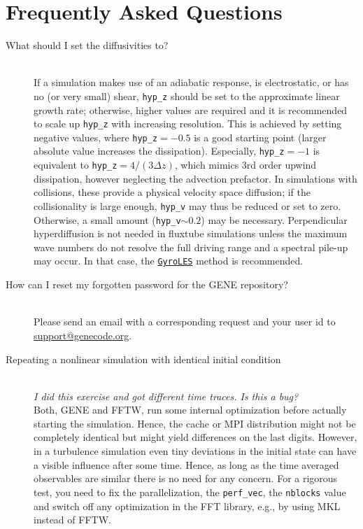 \newpage
\section{Frequently Asked Questions}

\begin{description}
\item[\hypertarget{hyp-advice}{What should I set the diffusivities to?}]\hspace*{1em}\\
If a simulation makes use of an adiabatic response, is electrostatic, or has no (or very small) shear,
\texttt{hyp\_z} should be set to the approximate linear growth rate;
otherwise, higher values are required and it is recommended to scale up \texttt{hyp\_z} with increasing resolution.
This is achieved by setting negative values, where
\texttt{hyp\_z}$=-0.5$ is a good starting point (larger absolute value increases the dissipation).
Especially, \texttt{hyp\_z}$=-1$ is equivalent to \texttt{hyp\_z}$=4/(3\Delta z)$,
which mimics 3rd order upwind dissipation, however neglecting the advection prefactor.
In simulations with collisions, these provide a physical velocity space diffusion;
if the collisionality is large enough, \texttt{hyp\_v} may thus be reduced or set to zero.
Otherwise, a small amount ({\tt hyp\_v}$\sim 0.2$) may be necessary.
Perpendicular hyperdiffusion is not needed in fluxtube simulations unless the maximum wave numbers do not
resolve the full driving range and a spectral pile-up may occur. In that case, the \hyperlink{gyroles}{\tt GyroLES}
method is recommended.

\item[How can I reset my forgotten password for the GENE repository?]\hspace*{1em}\\
Please send an email with a corresponding request and your user id to
\href{mailto:support@genecode.org}{support@genecode.org}.

\item[Repeating a nonlinear simulation with identical initial condition]\hspace*{1em}\\
{\em I did this exercise and got different time traces. Is this a bug?}\hspace*{1em}\\
Both, GENE and FFTW, run some internal optimization before actually starting the simulation. Hence, the cache or MPI distribution might not be completely identical but might yield differences on the last digits. However, in a turbulence simulation even tiny deviations in the initial state can have a visible influence after some time. Hence, as long as the time averaged observables are similar there is no need for any concern. For a rigorous test, you need to fix the parallelization, the \texttt{perf\_vec}, the \texttt{nblocks} value and switch off any optimization in the FFT library, e.g., by using MKL instead of FFTW.

\end{description}


